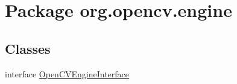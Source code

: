 \hypertarget{namespaceorg_1_1opencv_1_1engine}{}\section{Package org.\+opencv.\+engine}
\label{namespaceorg_1_1opencv_1_1engine}
\subsection*{Classes}
\begin{DoxyCompactItemize}
\item 
interface \mbox{\hyperlink{interfaceorg_1_1opencv_1_1engine_1_1_open_c_v_engine_interface}{Open\+C\+V\+Engine\+Interface}}
\end{DoxyCompactItemize}
